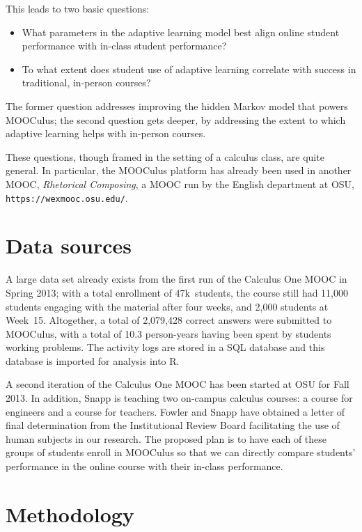\documentclass[12pt]{article}
\begin{document}
This leads to two basic questions:
\begin{itemize}
\item What parameters in the adaptive learning model best align online
  student performance with in-class student performance?
\item To what extent does student use of adaptive learning correlate
  with success in traditional, in-person courses?
\end{itemize}
The former question addresses improving the hidden Markov model that
powers MOOCulus; the second question gets deeper, by addressing the
extent to which adaptive learning helps with in-person courses.

These questions, though framed in the setting of a calculus class, are
quite general. In particular, the MOOCulus platform has already been
used in another MOOC, \textit{Rhetorical Composing}, a MOOC run by the
English department at OSU, \texttt{https://wexmooc.osu.edu/}.

\section{Data sources}

A large data set already exists from the first run of the Calculus One
MOOC in Spring 2013; with a total enrollment of 47k~students, the
course still had 11,000 students engaging with the material after four
weeks, and 2,000 students at Week~15.  Altogether, a total of
2,079,428 correct answers were submitted to MOOCulus, with a total of
10.3 person-years having been spent by students working problems.  The
activity logs are stored in a SQL database and this database is
imported for analysis into R.

A second iteration of the Calculus One MOOC has been started at OSU
for Fall 2013.  In addition, Snapp is teaching two on-campus calculus
courses: a course for engineers and a course for teachers.  Fowler and
Snapp have obtained a letter of final determination from the
Institutional Review Board facilitating the use of human subjects in
our research.  The proposed plan is to have each of these groups of
students enroll in MOOCulus so that we can directly compare students'
performance in the online course with their in-class performance.


\section{Methodology}
\end{document}
